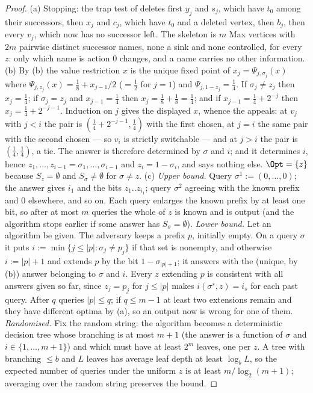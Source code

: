 \begin{proof}
(a) Stopping: the trap test of  deletes first $y_j$ and
$s_j$, which have $t_0$ among their successors, then $x_j$ and $c_j$, which
have $t_0$ and a deleted vertex, then $b_j$, then every $v_j$, which now has
no successor left.  The skeleton is
$m$ Max vertices with $2m$ pairwise distinct successor names, none a sink
and none controlled, for every $z$: only which name is action $0$ changes,
and a name carries no other information.
(b) By (b) the value restriction $x$ is the unique fixed
point of $x_j=\Psi_{j,\sigma_j}(x)$ where $\Psi_{j,z_j}(x)=\tfrac18+x_{j-1}/2$
($=\tfrac12$ for $j=1$) and $\Psi_{j,1-z_j}=\tfrac14$.  If $\sigma_j\ne z_j$
then $x_j=\tfrac14$; if $\sigma_j=z_j$ and $x_{j-1}=\tfrac14$ then
$x_j=\tfrac18+\tfrac18=\tfrac14$; and if $x_{j-1}=\tfrac14+2^{-j}$ then
$x_j=\tfrac14+2^{-j-1}$.  Induction on $j$ gives the displayed $x$, whence
the appeals: at $v_j$ with $j<i$ the pair is
$(\tfrac14+2^{-j-1},\tfrac14)$ with the first chosen, at $j=i$ the same
pair with the second chosen --- so $v_i$ is strictly switchable --- and at
$j>i$ the pair is $(\tfrac14,\tfrac14)$, a tie.  The answer is therefore
determined by $\sigma$ and $i$; and it determines $i$, hence
$z_1,\dots,z_{i-1}=\sigma_1,\dots,\sigma_{i-1}$ and $z_i=1-\sigma_i$, and
says nothing else.  $\Opt=\{z\}$ because $S_z=\emptyset$ and $S_\sigma\ne\emptyset$
for $\sigma\ne z$.
(c) \emph{Upper bound.}  Query $\sigma^1:=(0,\dots,0)$; the answer gives
$i_1$ and the bits $z_1..z_{i_1}$; query $\sigma^2$ agreeing with the known
prefix and $0$ elsewhere, and so on.  Each query enlarges the known prefix
by at least one bit, so after at most $m$ queries the whole of $z$ is known
and is output (and the algorithm stops earlier if some answer has
$S_\sigma=\emptyset$).
\emph{Lower bound.}  Let an algorithm be given.  The adversary keeps a
prefix $p$, initially empty.  On a query $\sigma$ it puts
$i:=\min\{j\le|p|:\sigma_j\ne p_j\}$ if that set is nonempty, and otherwise
$i:=|p|+1$ and extends $p$ by the bit $1-\sigma_{|p|+1}$; it answers with
the (unique, by (b)) answer belonging to $\sigma$ and $i$.  Every $z$
extending $p$ is consistent with all answers given so far, since
$z_j=p_j$ for $j\le|p|$ makes $i(\sigma^s,z)=i_s$ for each past query.
After $q$ queries $|p|\le q$; if $q\le m-1$ at least two extensions remain
and they have different optima by (a), so an output now is wrong for one of
them.  \emph{Randomised.}  Fix the random string: the algorithm becomes a
deterministic decision tree whose branching is at most $m+1$ (the answer is
a function of $\sigma$ and $i\in\{1,\dots,m+1\}$) and which must have at
least $2^{m}$ leaves, one per $z$.  A tree with branching $\le b$ and
$L$ leaves has average leaf depth at least $\log_b L$, so the expected
number of queries under the uniform $z$ is at least $m/\log_2(m+1)$;
averaging over the random string preserves the bound.
\end{proof}

